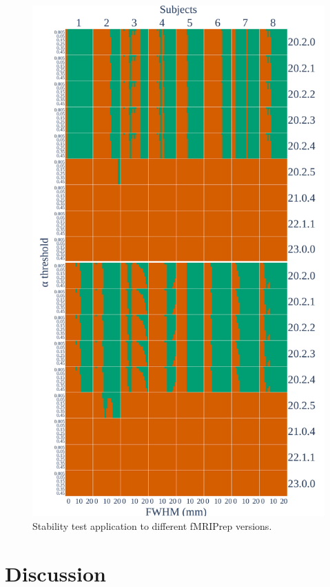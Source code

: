 \documentclass[lettersize,journal]{IEEEtran}
\newcommand{\fmriprep}{fMRIPrep\xspace}
\begin{document}
\begin{figure}
  \centering
  \includegraphics[width=\linewidth]{figures/fmriprep-versions/versions_fwe_bonferroni.pdf}
  \caption{Stability test application to different \fmriprep versions.}
  \label{fig:version_bonferroni}
\end{figure}


\section{Discussion}
\end{document}
